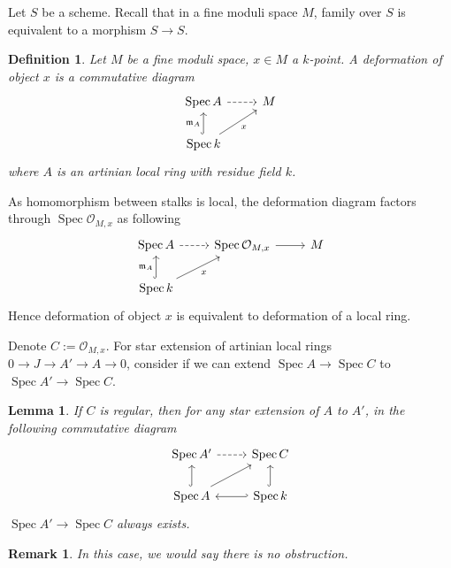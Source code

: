 \documentclass{ctexart}
\newtheorem{definition}{Definition}[section]
\newtheorem{remark}{Remark}[section]
\newtheorem{lemma}{Lemma}[section]
\newcommand{\spec}{\operatorname{Spec}}
\begin{document}
Let $S$ be a scheme.
Recall that in a fine moduli space $M$, family over $S$ is equivalent to a morphism $S \rightarrow S$.
\begin{definition}
    Let $M$ be a fine moduli space, $x\in M$ a $k$-point.
    A deformation of object $x$ is a commutative diagram
    \begin{equation}
        \begin{tikzcd}
            \spec A \arrow[r, dashrightarrow] &
            M \\
            \spec k \arrow[u, hookrightarrow, "\mathfrak{m}_{A}"] \arrow[ur, "x" swap] &
        \end{tikzcd}
    \end{equation}
    where $A$ is an artinian local ring with residue field $k$.
\end{definition}
As homomorphism between stalks is local, the deformation diagram factors through $\spec \mathcal{O}_{M, x}$ as following
\begin{equation}
    \begin{tikzcd}
        \spec A \arrow[r, dashrightarrow] &
        \spec \mathcal{O}_{M, x} \arrow[r] &
        M \\
        \spec k \arrow[u, hookrightarrow, "\mathfrak{m}_{A}"] \arrow[ur, "x" swap] &&
    \end{tikzcd}
\end{equation}
Hence deformation of object $x$ is equivalent to deformation of a local ring.
\par
Denote $C := \mathcal{O}_{M, x}$.
For star extension of artinian local rings $0 \rightarrow J \rightarrow A' \rightarrow A \rightarrow 0$,
consider if we can extend $\spec A \rightarrow \spec C$ to $\spec A' \rightarrow \spec C$.
\begin{lemma}
    If $C$ is regular, then for any star extension of $A$ to $A'$, in the following commutative diagram
    \begin{equation}
        \begin{tikzcd}
            \spec A' \arrow[r, dashrightarrow] &
            \spec C \\
            \spec A \arrow[u, hookrightarrow] \arrow[ur] \arrow[r, hookleftarrow] &
            \spec k \arrow[u, hookrightarrow]
        \end{tikzcd}
    \end{equation}
    $\spec A' \rightarrow \spec C$ always exists.
    \label{Lemma 3.1}
\end{lemma}
\begin{remark}
    In this case, we would say there is no obstruction.
\end{remark}
\end{document}
